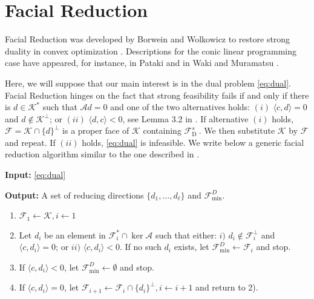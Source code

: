 \documentclass{article}
\newcommand{\inProd}[2]{\langle #1 , #2 \rangle }
\newcommand{\feasS}{\mathcal{F}_{\text{D }}^s}
\newcommand{\minFaceD}{ {\mathcal{F}_{\min}^D}}
\newcommand{\stdMap}{ {\mathcal{A}}}
\newcommand{\stdCone}{ {\mathcal{K}}}
\newcommand{\stdFace}{ \mathcal{F}}
\begin{document}
\section{Facial Reduction}\label{sec:fra}
Facial Reduction was developed by Borwein and Wolkowicz to restore strong duality 
in convex optimization \cite{borwein_facial_1981,Borwein1981495}. Descriptions for 
the conic linear programming case have appeared, for instance, in Pataki \cite{pataki_strong_2013} and 
in Waki and Muramatsu \cite{article_waki_muramatsu}.

Here, we will suppose that our main interest is in the dual problem \eqref{eq:dual}.
 Facial Reduction hinges on the fact that 
strong feasibility fails  if and only if there 
is $d \in \stdCone ^*$ such that $\stdMap d = 0$  and
one of the two alternatives holds: $(i)$  $\inProd{c}{d} = 0$ and $d \not \in \stdCone ^\perp$; or 
$(ii)$ $\inProd{d}{c} < 0$, see Lemma 3.2 in \cite{article_waki_muramatsu}. If 
alternative $(i)$ holds, $\stdFace = \stdCone \cap \{d\}^\perp$ is a proper face of $\stdCone$ 
containing $\feasS$.  We then substitute  $\stdCone$ by $\stdFace $ and repeat.
If  $(ii)$ holds, \eqref{eq:dual} is infeasible. 
 We write below a generic 
facial reduction algorithm similar to the one described in \cite{article_waki_muramatsu}.

\label{alg:gen_fra}

{\bf Input:} \eqref{eq:dual}

{\bf Output:} A set of reducing directions $\{d_1, \ldots, d_\ell\}$ and $\minFaceD$.
\begin{enumerate}
\item $\stdFace _1 \leftarrow \stdCone, i \leftarrow 1 $
\item Let $d_i$ be an element in $\stdFace _i ^* \cap \ker \stdMap$ such that either: 
$i)$ $d_i \not \in \stdFace _i^\perp$ and $\inProd{c}{d_i} = 0$; or $ii)$ $\inProd{c}{d_i} < 0$.
If no such $d_i$ exists, let $\minFaceD \leftarrow \stdFace _i$ and stop. 
\item If $\inProd{c}{d_i} < 0$, let $\minFaceD \leftarrow  \emptyset$ and stop.
\item If $\inProd{c}{d_i} = 0$, let $\stdFace _{i+1}  \leftarrow \stdFace _i  \cap \{d_i\}^\perp, i\leftarrow i+1$ and return to 2).
\end{enumerate}
\end{document}
